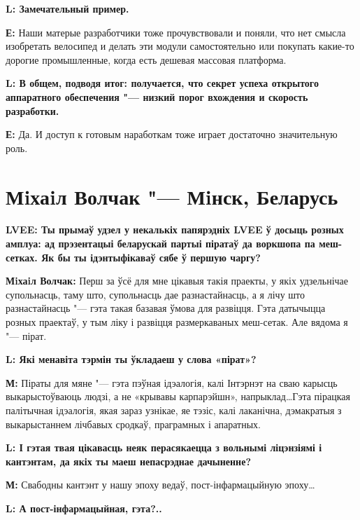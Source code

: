 \documentclass[10pt, a5paper]{article}
\begin{document}
{\noindent \bf L: Замечательный пример.}

{\noindent \bf Е:} Наши матерые разработчики тоже прочувствовали и поняли, что нет смысла изобретать велосипед и делать эти модули самостоятельно или покупать какие-то дорогие промышленные, когда есть дешевая массовая платформа.


{\noindent \bf L: В общем, подводя итог: получается, что секрет успеха открытого аппаратного обеспечения "--- низкий порог вхождения и скорость разработки.}

{\noindent \bf Е:} Да. И доступ к готовым наработкам тоже играет достаточно значительную роль.


\section{Мiхаiл Волчак "---  Мiнск, Беларусь}

{\noindent \bf LVEE: Ты прымаў удзел у некалькіх папярэдніх LVEE ў досыць розных амплуа: ад прэзентацыі беларускай партыі піратаў да воркшопа па меш-сетках. Як бы ты ідэнтыфікаваў сябе ў першую чаргу?
}

{\noindent \bf Мiхаiл Волчак:} Перш за ўсё для мне цікавыя такія праекты, у якіх удзельнічае супольнасць, таму што, супольнасць дае разнастайнасць, а я лічу што разнастайнасць "--- гэта такая базавая ўмова для развіцця. Гэта датычыцца розных праектаў, у тым ліку і развіцця размеркаваных меш-сетак. Але вядома я "--- пірат.

{\noindent \bf L: Які менавіта тэрмін ты ўкладаеш у слова «пірат»?}

{\noindent \bf М:} Піраты для мяне "--- гэта пэўная ідэалогія, калі Інтэрнэт на сваю карысць выкарыстоўваюць людзі, а не «крывавы карпарэйшн», напрыклад\ldots Гэта пірацкая палітычная ідэалогія, якая зараз узнікае, яе тэзіс, калі лаканічна, дэмакратыя з выкарыстаннем лічбавых сродкаў, праграмных і апаратных.




{\noindent \bf L: І гэтая твая цікавасць неяк перасякаецца з вольнымі ліцэнзіямі і кантэнтам, да якіх ты маеш непасрэднае дачыненне?} 

{\noindent \bf М:}  Свабодны кантэнт у нашу эпоху ведаў, пост-інфармацыйную эпоху\ldots

{\noindent \bf L: А пост-інфармацыйная, гэта?..}
\end{document}
